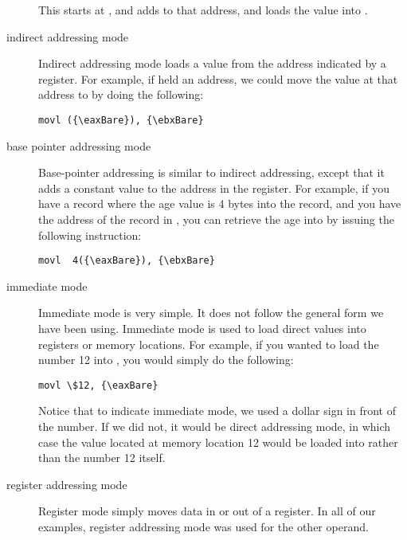 \begin{description}
This starts at , and adds  to that address, and loads the value into {\eaxReg}.
\item[indirect addressing mode\index{indirect addressing mode}] Indirect addressing mode loads a value from the address indicated by a register.  For example, if {\eaxReg} held an address, we could move the value at that
address to {\ebxReg} by doing the following:
\begin{simpletyping}
\begin{lstlisting}
movl ({\eaxBare}), {\ebxBare}
\end{lstlisting}
\end{simpletyping}
\item[base pointer addressing mode\index{base pointer addressing mode}] Base-pointer addressing is similar to indirect addressing, except that it
adds a constant value to the address in the register.  For example, if you
have a record where the age value is 4 bytes into the record, and you have the
address of the record in {\eaxReg}, you can retrieve the age into {\ebxReg} by 
issuing the following instruction:
\begin{simpletyping}
\begin{lstlisting}
movl  4({\eaxBare}), {\ebxBare}
\end{lstlisting}
\end{simpletyping}
\item[immediate mode\index{immediate mode addressing}] Immediate mode is very simple.  It does not follow the general form we have
been using.  Immediate mode is used to load direct values into registers
or memory locations.  For example, if you wanted to load the number 12
into {\eaxReg}, you would simply do the following:
\begin{simpletyping}
\begin{lstlisting}
movl \$12, {\eaxBare}
\end{lstlisting}
\end{simpletyping}

Notice that to indicate immediate mode, we used a dollar sign in front of
the number.  If we did not, it would be direct addressing mode, in which 
case the value located at memory location 12 would be loaded into {\eaxReg}
rather than the number 12 itself.
\item[register addressing mode\index{register addressing mode}] Register mode simply moves data in or out of a register.  In all of our 
examples, register addressing mode was used for the other operand.
\end{description}


